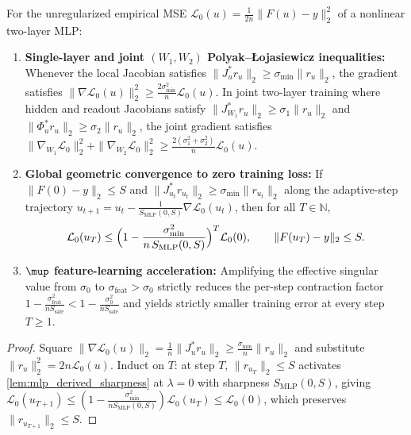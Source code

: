 \begin{lemma}\label{lem:joint_pl_convergence}
\leanok
{}
For the unregularized empirical MSE $\mathcal{L}_0(u) = \frac{1}{2n}\|F(u)-y\|_2^2$ of a nonlinear two-layer MLP:
\begin{enumerate}
\item \textbf{Single-layer and joint $(W_1, W_2)$ Polyak--{\L}ojasiewicz inequalities:} Whenever the local Jacobian satisfies $\|J_u^* r_u\|_2 \ge \sigma_{\min}\|r_u\|_2$, the gradient satisfies $\|\nabla\mathcal{L}_0(u)\|_2^2 \ge \frac{2\sigma_{\min}^2}{n}\mathcal{L}_0(u)$. In joint two-layer training where hidden and readout Jacobians satisfy $\|J_{W_1}^* r_u\|_2 \ge \sigma_1\|r_u\|_2$ and $\|\Phi_u^* r_u\|_2 \ge \sigma_2\|r_u\|_2$, the joint gradient satisfies $\|\nabla_{W_1}\mathcal{L}_0\|_2^2 + \|\nabla_{W_2}\mathcal{L}_0\|_2^2 \ge \frac{2(\sigma_1^2 + \sigma_2^2)}{n}\mathcal{L}_0(u)$.
\item \textbf{Global geometric convergence to zero training loss:} If $\|F(0)-y\|_2\le S$ and $\|J_{u_t}^* r_{u_t}\|_2 \ge \sigma_{\min}\|r_{u_t}\|_2$ along the adaptive-step trajectory $u_{t+1} = u_t - \frac{1}{S_{\mathrm{MLP}}(0,S)}\nabla\mathcal{L}_0(u_t)$, then for all $T\in\mathbb{N}$,
\[
\mathcal{L}_0(u_T) \le \Bigl(1 - \frac{\sigma_{\min}^2}{n\,S_{\mathrm{MLP}}(0,S)}\Bigr)^T \mathcal{L}_0(0),\qquad \|F(u_T)-y\|_2 \le S.
\]
\item \textbf{$\mup$ feature-learning acceleration:} Amplifying the effective singular value from $\sigma_0$ to $\sigma_{\mathrm{feat}} > \sigma_0$ strictly reduces the per-step contraction factor $1 - \frac{\sigma_{\mathrm{feat}}^2}{n S_{\mathrm{safe}}} < 1 - \frac{\sigma_0^2}{n S_{\mathrm{safe}}}$ and yields strictly smaller training error at every step $T\ge 1$.
\end{enumerate}
\end{lemma}
\begin{proof}
\leanok
Square $\|\nabla\mathcal{L}_0(u)\|_2 = \frac{1}{n}\|J_u^* r_u\|_2 \ge \frac{\sigma_{\min}}{n}\|r_u\|_2$ and substitute $\|r_u\|_2^2 = 2n\mathcal{L}_0(u)$. Induct on $T$: at step $T$, $\|r_{u_T}\|_2\le S$ activates \cref{lem:mlp_derived_sharpness} at $\lambda=0$ with sharpness $S_{\mathrm{MLP}}(0,S)$, giving $\mathcal{L}_0(u_{T+1}) \le (1 - \frac{\sigma_{\min}^2}{n S_{\mathrm{MLP}}(0,S)})\mathcal{L}_0(u_T) \le \mathcal{L}_0(0)$, which preserves $\|r_{u_{T+1}}\|_2\le S$.
\end{proof}

